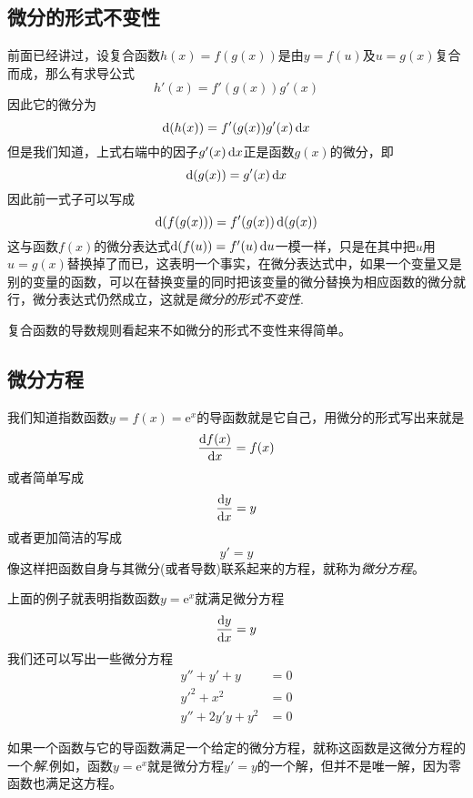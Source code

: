 \subsection{微分的形式不变性}
\label{sec:the-non-variabriant-format-of-differtial}

前面已经讲过，设复合函数$h(x)=f(g(x))$是由$y=f(u)$及$u=g(x)$复合而成，那么有求导公式
\[ h'(x) = f'(g(x))g'(x) \]
因此它的微分为
\[ \mathop{}\!\mathrm{d} (h(x)) = f'(g(x)) g'(x) \mathop{}\!\mathrm{d} x \]
但是我们知道，上式右端中的因子$g'(x) \mathop{}\!\mathrm{d} x$正是函数$g(x)$的微分，即
\[ \mathop{}\!\mathrm{d} (g(x)) = g'(x) \mathop{}\!\mathrm{d} x \]
因此前一式子可以写成
\[ \mathop{}\!\mathrm{d} (f(g(x))) = f'(g(x)) \mathop{}\!\mathrm{d} (g(x)) \]
这与函数$f(x)$的微分表达式$\mathop{}\!\mathrm{d} (f(u)) = f'(u) \mathop{}\!\mathrm{d} u$一模一样，只是在其中把$u$用$u=g(x)$替换掉了而已，这表明一个事实，在微分表达式中，如果一个变量又是别的变量的函数，可以在替换变量的同时把该变量的微分替换为相应函数的微分就行，微分表达式仍然成立，这就是\emph{微分的形式不变性}.

复合函数的导数规则看起来不如微分的形式不变性来得简单。

\subsection{微分方程}
\label{sec:differtial-equation}

我们知道指数函数$y=f(x)=\mathrm{e}^x$的导函数就是它自己，用微分的形式写出来就是
\[ \frac{\mathop{}\!\mathrm{d} f(x)}{\mathop{}\!\mathrm{d} x} = f(x) \]
或者简单写成
\[ \frac{\mathop{}\!\mathrm{d} y}{\mathop{}\!\mathrm{d} x} = y \]
或者更加简洁的写成
\[ y'=y \]
像这样把函数自身与其微分(或者导数)联系起来的方程，就称为\emph{微分方程}。

上面的例子就表明指数函数$y=\mathrm{e}^x$就满足微分方程
\[ \frac{\mathop{}\!\mathrm{d} y}{\mathop{}\!\mathrm{d} x} = y \]
我们还可以写出一些微分方程
\begin{align*}
  y''+y'+y&=0 \\
  y'^2+x^2&=0 \\
  y''+2y'y+y^2& = 0
\end{align*}

如果一个函数与它的导函数满足一个给定的微分方程，就称这函数是这微分方程的一个\emph{解}.例如，函数$y=\mathrm{e}^x$就是微分方程$y'=y$的一个解，但并不是唯一解，因为零函数也满足这方程。



